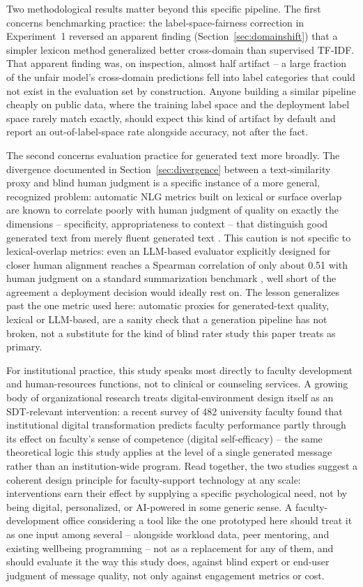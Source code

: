 \documentclass[higheredu,article,submit,pdftex,moreauthors]{Definitions/mdpi}
\begin{document}
Two methodological results matter beyond this specific pipeline. The first concerns benchmarking practice: the label-space-fairness correction in Experiment~1 reversed an apparent finding (Section~\ref{sec:domainshift}) that a simpler lexicon method generalized better cross-domain than supervised TF-IDF. That apparent finding was, on inspection, almost half artifact -- a large fraction of the unfair model's cross-domain predictions fell into label categories that could not exist in the evaluation set by construction. Anyone building a similar pipeline cheaply on public data, where the training label space and the deployment label space rarely match exactly, should expect this kind of artifact by default and report an out-of-label-space rate alongside accuracy, not after the fact.

The second concerns evaluation practice for generated text more broadly. The divergence documented in Section~\ref{sec:divergence} between a text-similarity proxy and blind human judgment is a specific instance of a more general, recognized problem: automatic NLG metrics built on lexical or surface overlap are known to correlate poorly with human judgment of quality on exactly the dimensions -- specificity, appropriateness to context -- that distinguish good generated text from merely fluent generated text \cite{sai2022}. This caution is not specific to lexical-overlap metrics: even an LLM-based evaluator explicitly designed for closer human alignment reaches a Spearman correlation of only about 0.51 with human judgment on a standard summarization benchmark \cite{liu2023geval}, well short of the agreement a deployment decision would ideally rest on. The lesson generalizes past the one metric used here: automatic proxies for generated-text quality, lexical or LLM-based, are a sanity check that a generation pipeline has not broken, not a substitute for the kind of blind rater study this paper treats as primary.

For institutional practice, this study speaks most directly to faculty development and human-resources functions, not to clinical or counseling services. A growing body of organizational research treats digital-environment design itself as an SDT-relevant intervention: a recent survey of 482 university faculty found that institutional digital transformation predicts faculty performance partly through its effect on faculty's sense of competence (digital self-efficacy) \cite{sunyoon2025} -- the same theoretical logic this study applies at the level of a single generated message rather than an institution-wide program. Read together, the two studies suggest a coherent design principle for faculty-support technology at any scale: interventions earn their effect by supplying a specific psychological need, not by being digital, personalized, or AI-powered in some generic sense. A faculty-development office considering a tool like the one prototyped here should treat it as one input among several -- alongside workload data, peer mentoring, and existing wellbeing programming \cite{watts2011} -- not as a replacement for any of them, and should evaluate it the way this study does, against blind expert or end-user judgment of message quality, not only against engagement metrics or cost.
\end{document}
